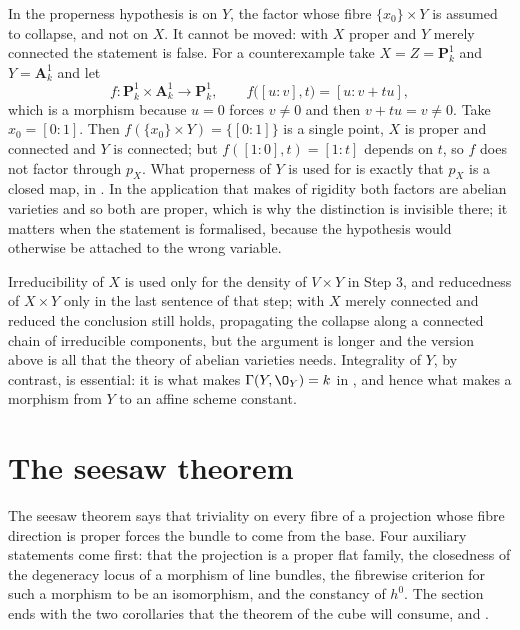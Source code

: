 \begin{warning}
\label{warn:cube-proper-factor}
In  the properness hypothesis is on $Y$, the factor
whose fibre $\{x_0\}\times Y$ is assumed to collapse, and not on $X$.  It
cannot be moved: with $X$ proper and $Y$ merely connected the statement is
false.  For a counterexample take $X=Z=\mathbf P^1_k$ and
$Y=\mathbf A^1_k$ and let
\[
  f\colon\mathbf P^1_k\times\mathbf A^1_k\to\mathbf P^1_k,\qquad
  f\bigl([u:v],t\bigr)=[u:v+tu] ,
\]
which is a morphism because $u=0$ forces $v\neq0$ and then $v+tu=v\neq0$.
Take $x_0=[0:1]$.  Then $f(\{x_0\}\times Y)=\{[0:1]\}$ is a single point, $X$
is proper and connected and $Y$ is connected; but $f([1:0],t)=[1:t]$ depends
on $t$, so $f$ does not factor through $p_X$.  What properness of $Y$ is used
for is exactly that $p_X$ is a closed map, in
.  In the application that
 makes of rigidity both factors are abelian varieties
and so both are proper, which is why the distinction is invisible there; it
matters when the statement is formalised, because the hypothesis would
otherwise be attached to the wrong variable.
\end{warning}

\begin{remark}\label{rem:cube-rigidity-weaker}
Irreducibility of $X$ is used only for the density of $V\times Y$ in Step 3,
and reducedness of $X\times Y$ only in the last sentence of that step; with
$X$ merely connected and reduced the conclusion still holds, propagating the
collapse along a connected chain of irreducible components, but the argument
is longer and the version above is all that the theory of abelian varieties
needs.
Integrality of $Y$, by contrast, is essential: it is what makes
$\Gamma(Y,\O_Y)=k$ in , and hence what makes a
morphism from $Y$ to an affine scheme constant.
\end{remark}

\section{The seesaw theorem}\label{sec:cube-seesaw}

The seesaw theorem says that triviality on every fibre of a projection whose
fibre direction is proper forces the bundle to come from the base.  Four
auxiliary statements come first: that the projection is a proper flat family,
the closedness of the degeneracy locus of a morphism of line bundles, the
fibrewise criterion for such a morphism to be an isomorphism, and the
constancy of $h^0$.  The section ends with the two corollaries that the
theorem of the cube will consume,  and
.


